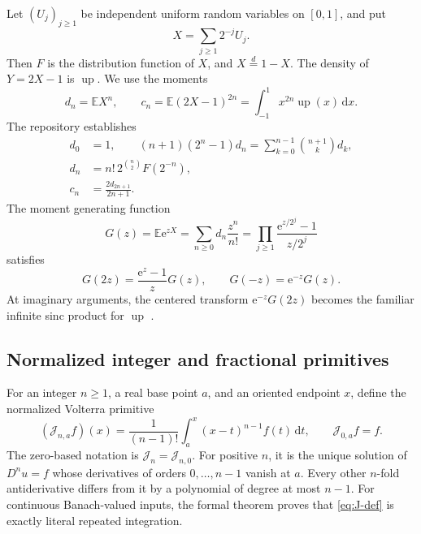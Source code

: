 \documentclass[11pt,oneside]{article}
\theoremstyle{definition}
\theoremstyle{remark}
\newcommand{\Up}{\operatorname{up}}
\newcommand{\E}{\mathbb E}
\newcommand{\dd}{\,\mathrm d}
\newcommand{\e}{\mathrm e}
\newcommand{\Jn}{\mathcal J}
\newcommand{\1}{\mathbf 1}
\begin{document}
Let \((U_j)_{j\geq1}\) be independent uniform random variables on \([0,1]\),
and put
\begin{equation}
 X=\sum_{j\geq1}2^{-j}U_j.                                      \label{eq:X-def}
\end{equation}
Then \(F\) is the distribution function of \(X\), and \(X\overset d=1-X\).
The density of \(Y=2X-1\) is \(\Up\).  We use the moments
\begin{equation}
 d_n=\E X^n,
 \qquad
 c_n=\E(2X-1)^{2n}=\int_{-1}^1x^{2n}\Up(x)\dd x.                \label{eq:dc-def}
\end{equation}
The repository establishes
\begin{align}
 d_0&=1,\qquad
 (n+1)(2^n-1)d_n=\sum_{k=0}^{n-1}\binom{n+1}{k}d_k,             \label{eq:d-rec}\\
 d_n&=n!\,2^{\binom n2}F(2^{-n}),                               \label{eq:d-dyadic}\\
 c_n&=\frac{2d_{2n+1}}{2n+1}.                                  \label{eq:c-d}
\end{align}
The moment generating function
\begin{equation}
 G(z)=\E\e^{zX}=\sum_{n\geq0}d_n\frac{z^n}{n!}
 =\prod_{j\geq1}\frac{\e^{z/2^j}-1}{z/2^j}                    \label{eq:G-product}
\end{equation}
satisfies
\begin{equation}
 G(2z)=\frac{\e^z-1}{z}G(z),\qquad G(-z)=\e^{-z}G(z).           \label{eq:G-fe}
\end{equation}
At imaginary arguments, the centered transform
\(\e^{-z}G(2z)\) becomes the familiar infinite sinc product for \(\Up\)
\cite{AriasCompact,Rvachev1990,ProveItPrimary}.

\subsection{Normalized integer and fractional primitives}
For an integer \(n\geq1\), a real base point \(a\), and an oriented endpoint
\(x\), define the normalized Volterra primitive
\begin{equation}
 (\Jn_{n,a}f)(x)=\frac1{(n-1)!}\int_a^x(x-t)^{n-1}f(t)\dd t,
 \qquad \Jn_{0,a}f=f.                                         \label{eq:J-def}
\end{equation}
The zero-based notation is \(\Jn_n=\Jn_{n,0}\).  For positive \(n\), it is
the unique solution of \(D^n u=f\) whose derivatives of orders
\(0,\dots,n-1\) vanish at \(a\).  Every other \(n\)-fold antiderivative differs
from it by a polynomial of degree at most \(n-1\).  For continuous
Banach-valued inputs, the formal theorem
 proves that
\eqref{eq:J-def} is exactly literal repeated integration.
\end{document}
